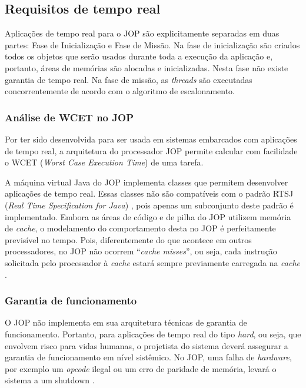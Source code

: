 \documentclass[10pt,twocolumn]{article}
\begin{document}

\subsection{Requisitos de tempo real}
	Aplicações de tempo real para o JOP são explicitamente separadas em duas partes: {F}ase de {I}nicialização e {F}ase de {M}issão. Na fase de inicialização são criados todos os objetos que serão usados durante toda a execução da aplicação e, portanto, áreas de memórias são alocadas e inicializadas. Nesta fase não existe garantia de tempo real. Na fase de missão, as \emph{threads} são executadas concorrentemente de acordo com o algoritmo de escalonamento.
\subsubsection{Análise de WCET no JOP}
	Por ter sido desenvolvida para ser usada em sistemas embarcados com aplicações de tempo real, a arquitetura do processador JOP permite calcular com facilidade o WCET (\emph{Worst Case Execution Time}) de uma tarefa.

	A máquina virtual Java do JOP implementa classes que permitem desenvolver aplicações de tempo real. Essas classes não são compatíveis com o padrão RTSJ (\emph {Real Time Specification for Java}) \cite{onjava}, pois apenas um subconjunto deste padrão é implementado. Embora as áreas de código e de pilha do JOP utilizem memória de \emph{cache}, o modelamento do comportamento desta no JOP é perfeitamente previsível no tempo. Pois, diferentemente do que acontece em outros processadores, no JOP não ocorrem ``\emph{cache misses}'', ou seja, cada instrução solicitada pelo processador à \emph{cache} estará sempre previamente carregada na \emph{cache} \cite{MartinThesis}.
\subsubsection{Garantia de funcionamento}
	O JOP não implementa em sua arquitetura técnicas de garantia de funcionamento. Portanto, para aplicações de tempo real do tipo \emph{hard}, ou seja, que envolvem risco para vidas humanas, o projetista do sistema deverá assegurar a garantia de funcionamento em nível sistêmico. 	No JOP, uma falha de \emph{hardware},  por exemplo um \emph{opcode} ilegal ou um erro de paridade de memória, levará o sistema a um shutdown \cite{JopHandbook}.
\end{document}
